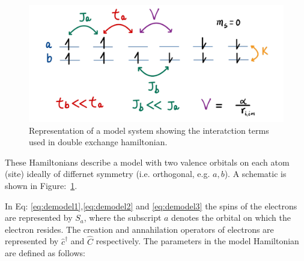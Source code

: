 \documentclass[12pt,twoside]{report}
\begin{document}
	
	
	\begin{figure}[ht]
		\centering
			\includegraphics[scale=0.25]{DE.png}
		\caption{\label{fig:deham} Representation of a model system showing the interatction terms used in double exchange hamiltonian. }
	\end{figure}
	These Hamiltonians describe a model with two valence orbitals on each
	atom (site) ideally of differnet symmetry (i.e. orthogonal, e.g. $a,b$). A schematic is shown in
	Figure:~\ref{fig:deham}.
			
			
	In Eq: \ref{eq:demodel1},\ref{eq:demodel2} and \ref{eq:demodel3} the spins of the electrons are represented by $S_a$,
	where the subscript $a$ denotes the orbital on which the electron resides.  The
	creation and annahilation operators of electrons are represented by
	$\hat{c}^{\dagger}$ and $\hat{C}$ respectively. The parameters in the model
	Hamiltonian are defined as follows:
	
\end{document}
